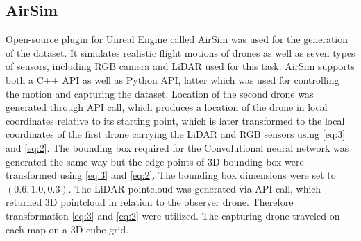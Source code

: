 \documentclass[twoside]{ctuthesis}
\theoremstyle{plain}
\theoremstyle{definition}
\theoremstyle{note}
\begin{document}
\subsection{AirSim}
Open-source plugin for Unreal Engine called AirSim was used for the generation of the dataset. It simulates realistic flight motions of drones as well as seven types of sensors, including RGB camera and LiDAR used for this task. AirSim supports both a C++ API as well as Python API, latter which was used for controlling the motion and capturing the dataset. Location of the second drone was generated through API call, which produces a location of the drone in local coordinates relative to its starting point, which is later transformed to the local coordinates of the first drone carrying the LiDAR and RGB sensors using \autoref{eq:3} and \autoref{eq:2}. The bounding box required for the Convolutional neural network was generated the same way but the edge points of 3D bounding box were transformed using \autoref{eq:3} and \autoref{eq:2}. The bounding box dimensions were set to $(0.6, 1.0, 0.3)$. The LiDAR pointcloud was generated via API call, which returned 3D pointcloud in relation to the observer drone. Therefore transformation \autoref{eq:3} and \autoref{eq:2} were utilized. The capturing drone traveled on each map on a 3D cube grid.
\end{document}
